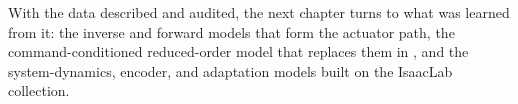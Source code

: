 With the data described and audited, the next chapter turns to what was
learned from it: the inverse and forward models that form the
\ppoIDFD{} actuator path, the command-conditioned reduced-order model
that replaces them in \ppoROM, and the system-dynamics, encoder, and
adaptation models built on the IsaacLab collection.
